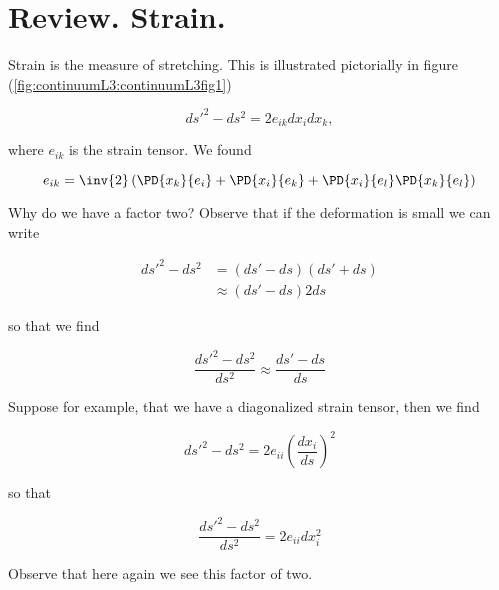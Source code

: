 \label{chap:continuumL3}
{}

\section{Review.  Strain.}

Strain is the measure of stretching.  This is illustrated pictorially in figure (\ref{fig:continuumL3:continuumL3fig1})

\begin{equation}\label{eqn:continuumL3:10}
{ds'}^2 - ds^2 = 2 e_{ik} dx_i dx_k,
\end{equation}

where $e_{ik}$ is the strain tensor.  We found

\begin{equation}\label{eqn:continuumL3:30}
e_{ik} = \inv{2} \left( 
\PD{x_k}{e_i} 
+\PD{x_i}{e_k} 
+
\PD{x_i}{e_l} 
\PD{x_k}{e_l} 
\right)
\end{equation}

Why do we have a factor two?  Observe that if the deformation is small we can write

\begin{align*}
{ds'}^2 - ds^2 
&= (ds' - ds)(ds' + ds) \\
&\approx
 (ds' - ds) 2 ds
\end{align*}

so that we find 

\begin{equation}\label{eqn:continuumL3:50}
\frac{{ds'}^2 - ds^2 }{ds^2}
\approx
\frac{ds' - ds }{ds}
\end{equation}

Suppose for example, that we have a diagonalized strain tensor, then we find

\begin{equation}\label{eqn:continuumL3:70}
{ds'}^2 - ds^2 
= 2 e_{ii} \left(\frac{dx_i}{ds}\right)^2
\end{equation}

so that

\begin{equation}\label{eqn:continuumL3:90}
\frac{
{ds'}^2 - ds^2 
}{ds^2}
= 2 e_{ii} dx_i^2
\end{equation}

Observe that here again we see this factor of two.

